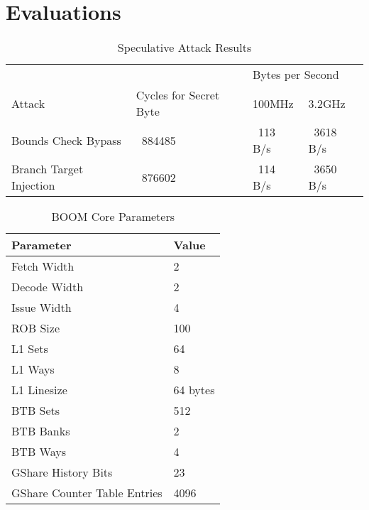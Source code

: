 \section{Evaluations}

\begin{table}
\centering
\caption{Speculative Attack Results}
\label{tab:spec-attack-results}
\begin{tabular}{@{} *4l @{}} \toprule
    &                        & \multicolumn{2}{l}{Bytes per Second} \\
    Attack                  & Cycles for Secret Byte &           100MHz &   3.2GHz \\ \midrule
    Bounds Check Bypass     &                ~884485 &          ~113 B/s & ~3618 B/s \\
    Branch Target Injection &                ~876602 &          ~114 B/s & ~3650 B/s \\ \bottomrule
\end{tabular}
\end{table}

\begin{table}
\centering \caption{BOOM Core Parameters} \label{tab:boom-core-params}
\begin{tabular}{@{} *2l @{}} \toprule
    Parameter                    & Value \\ \midrule
    Fetch Width                  & 2 \\
    Decode Width                 & 2 \\
    Issue Width                  & 4 \\
    ROB Size                     & 100 \\ \midrule
    L1 Sets                      & 64 \\
    L1 Ways                      & 8 \\
    L1 Linesize                  & 64 bytes \\ \midrule
    BTB Sets                     & 512 \\
    BTB Banks                    & 2 \\
    BTB Ways                     & 4 \\ \midrule
    GShare History Bits          & 23 \\
    GShare Counter Table Entries & 4096 \\ \bottomrule
\end{tabular}
\end{table}


